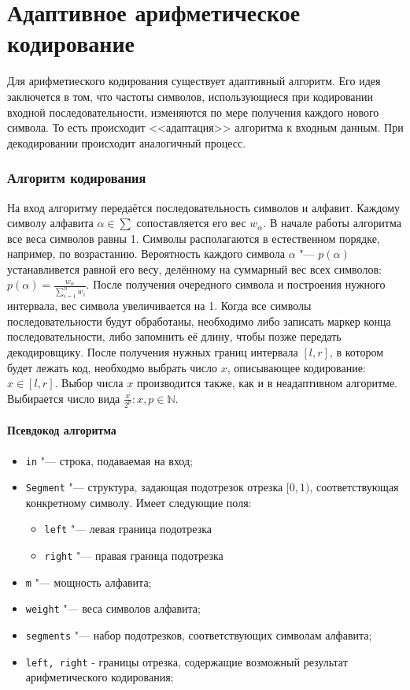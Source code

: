 \documentclass[12pt]{article}
\author{\copyright~~@mikhirurg}
\date{17 nov 2019}
\begin{document}
\pagestyle{fancy}
\part*{Адаптивное арифметическое кодирование}
Для арифметиеского кодирования существует адаптивный алгоритм. Его идея заключется в том, что частоты символов, использующиеся при кодировании входной последовательности, изменяются по мере получения каждого нового символа. То есть происходит <<адаптация>> алгоритма к входным данным. При декодировании происходит аналогичный процесс.
\section*{Алгоритм кодирования}
На вход алгоритму передаётся последовательность символов и алфавит. Каждому символу алфавита $\alpha \in \sum $
сопоставляется его вес 
$ w_\alpha $. В начале работы алгоритма все веса символов равны 1.
Символы располагаются в естественном порядке, например, по возрастанию. Вероятность каждого символа $ \alpha $ "--- $ p(\alpha) $ устанавливется равной его весу, делённому на суммарный вес всех символов: $ p(\alpha) = \frac{w_\alpha}{\sum_{i=1}^n w_i} $. После получения очередного символа и построения нужного интервала, вес символа увеличивается на 1. Когда все символы последовательности будут обработаны, необходимо либо записать маркер конца последовательности, либо запомнить её длину, чтобы позже передать декодировщику. После получения нужных границ интервала $[l, r]$, в котором будет лежать код, необходмо выбрать число $ x $, описывающее кодирование:
$ x \in [l, r]$. Выбор числа $x$ производится также, как и в неадаптивном алгоритме. Выбирается число вида $ \frac{x}{2^p}: x,p \in \mathbb N$.

\subsection*{Псевдокод алгоритма}

\begin{itemize}
	\item \verb'in' "--- строка, подаваемая на вход;
	\item \verb'Segment' "--- структура, задающая подотрезок отрезка $[0, 1)$, соответствующая конкретному символу.
   Имеет следующие поля:
   \begin{itemize}
		\item \verb'left' "--- левая граница подотрезка
		\item \verb'right' "--- правая граница подотрезка
	\end{itemize}
	\item \verb'm' "--- мощность алфавита;
   \item \verb'weight' "--- веса символов алфавита;
	\item \verb'segments' "--- набор подотрезков, соответствующих символам алфавита;
	\item \verb'left, right' - границы отрезка, содержащие возможный результат арифметического кодирования;
\end{itemize}
\end{document}
